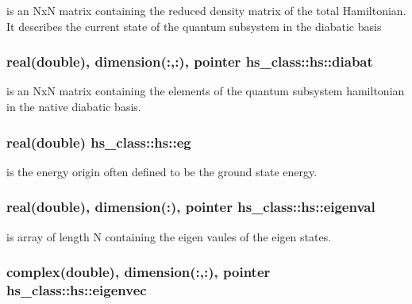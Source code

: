 is an Nx\-N matrix containing the reduced density matrix of the total Hamiltonian. It describes the current state of the quantum subsystem in the diabatic basis 

\hypertarget{strucths__class_1_1hs_a18f6eb65a6edae047d41c8aa5a3d9d09}{
\subsubsection[{diabat}]{\setlength{\rightskip}{0pt plus 5cm}real(double), dimension(\-:,\-:), pointer hs\-\_\-class\-::hs\-::diabat\hspace{0.3cm}{\ttfamily [private]}}}\label{strucths__class_1_1hs_a18f6eb65a6edae047d41c8aa5a3d9d09}


is an Nx\-N matrix containing the elements of the quantum subsystem hamiltonian in the native diabatic basis. 

\hypertarget{strucths__class_1_1hs_aa0f4d851a33f1d195d2b6b9334cdb5d5}{
\subsubsection[{eg}]{\setlength{\rightskip}{0pt plus 5cm}real(double) hs\-\_\-class\-::hs\-::eg\hspace{0.3cm}{\ttfamily [private]}}}\label{strucths__class_1_1hs_aa0f4d851a33f1d195d2b6b9334cdb5d5}


is the energy origin often defined to be the ground state energy. 

\hypertarget{strucths__class_1_1hs_ae978013c998c123a7430209fa2797511}{
\subsubsection[{eigenval}]{\setlength{\rightskip}{0pt plus 5cm}real(double), dimension(\-:), pointer hs\-\_\-class\-::hs\-::eigenval\hspace{0.3cm}{\ttfamily [private]}}}\label{strucths__class_1_1hs_ae978013c998c123a7430209fa2797511}


is array of length N containing the eigen vaules of the eigen states. 

\hypertarget{strucths__class_1_1hs_aac60f7bc14df6c4a5a1363c70b69b2db}{
\subsubsection[{eigenvec}]{\setlength{\rightskip}{0pt plus 5cm}complex(double), dimension(\-:,\-:), pointer hs\-\_\-class\-::hs\-::eigenvec\hspace{0.3cm}{\ttfamily [private]}}}\label{strucths__class_1_1hs_aac60f7bc14df6c4a5a1363c70b69b2db}



